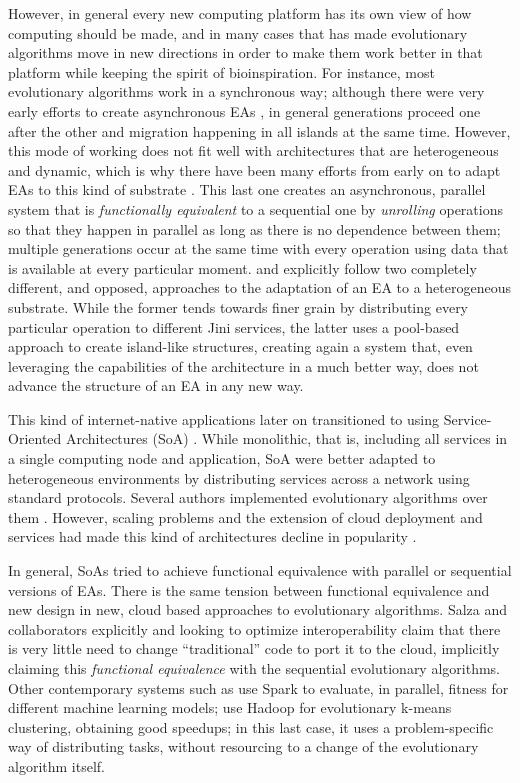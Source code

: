 \documentclass[sigconf]{acmart}
\begin{document}
However, in general every new computing platform has its own view of
how computing should be made, and in many cases that has made
evolutionary algorithms move in new directions in order to make them
work better in that platform while keeping the spirit of
bioinspiration. For instance, most evolutionary algorithms work in a
synchronous way; although there were very early efforts to create
asynchronous EAs \cite{coleman89}, in general
generations proceed one after the other and migration happening in
all islands at the same time. However, this mode of working does not
fit well with architectures that are heterogeneous and dynamic, which
is why there have been many efforts from early
on to adapt EAs to this kind of substrate
\cite{Jini:FEA2000,zorman2002creation,baugh2003asynchronous}. This
last one creates an asynchronous, parallel system that is {\em functionally
  equivalent} to a sequential one by {\em unrolling} operations so
that they happen in parallel as long as there is no dependence between
them; multiple generations occur at the same time with every operation
using data that is available at every particular
moment. \cite{Jini:FEA2000} and \cite{zorman2002creation} explicitly
follow two completely different, and opposed, approaches to the
adaptation of an EA to a heterogeneous substrate. While the former
tends towards finer grain by distributing every particular operation
to different Jini services, the latter uses a pool-based approach to
create island-like structures, creating again a system that, even
leveraging the capabilities of the architecture in a much better way,
does not advance the  structure of an EA in any new way.

This kind of internet-native applications later on transitioned to
using Service-Oriented Architectures (SoA) \cite{Papazoglou2007}. While monolithic, that is,
including all services in a single computing node and application, SoA
were better adapted to heterogeneous environments by distributing
services across a network using standard protocols. Several authors
implemented evolutionary algorithms over them
\cite{garcia2013service,munawar2010design,6955331}. However, scaling
problems and the extension of cloud deployment and services had made
this kind of architectures decline in popularity
\cite{Varghese2018849}.

In general, SoAs tried to achieve functional equivalence with parallel
or sequential versions of EAs. There is the same tension between
functional equivalence and new
design in new, cloud based approaches to evolutionary
algorithms. Salza and collaborators \cite{salza2017ccube,de2017parallel} explicitly
and looking to optimize interoperability claim that there is very
little need to change ``traditional'' code to port it to the cloud,
implicitly claiming this {\em functional equivalence} with the
sequential evolutionary algorithms. Other contemporary systems such as
\cite{10.1007/978-3-319-32149-3_46} use Spark to evaluate, in
parallel, fitness for different machine learning models;
\cite{de2015scalable} use Hadoop for evolutionary k-means clustering,
obtaining good speedups; in this last case, it uses a problem-specific
way of distributing tasks, without resourcing to a change of the
evolutionary algorithm itself.
\end{document}
